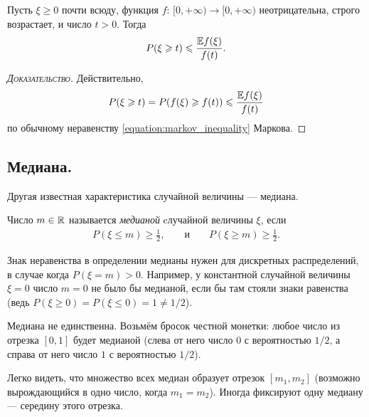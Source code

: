 \documentclass[../main.tex]{subfiles}
\begin{document}
\begin{prop}
 Пусть $ \xi \geqslant 0 $ почти всюду, функция $f \colon\, [0, +\infty) \to [0, +\infty)$ неотрицательна, строго возрастает, и число $ t > 0 $. Тогда
 \begin{align}
  \label{eq:general_markov_ineq}
  P(\xi \geqslant t) \leqslant \frac{\mathbb E f(\xi)}{f(t)}.
 \end{align}
\end{prop}
\begin{proof}[\normalfont\textsc{Доказательство}]
 Действительно,
 \begin{align*}
  P(\xi \geqslant t) = P(f(\xi) \geqslant f(t)) \leqslant \frac{\mathbb E f(\xi)}{f(t)}
 \end{align*} по обычному неравенству \eqref{equation:markov_inequality} Маркова.
\end{proof}

\subsection{Медиана.}

Другая известная характеристика случайной величины --- медиана.

\begin{df}
 Число $ m \in\mathbb{R}$ называется \textit{медианой} cлучайной величины $ \xi $, если
 \begin{align*}
  P(\xi \leqslant m) \geqslant \frac{1}{2}, & &\text{ и } & &P(\xi \geqslant m) \geqslant \frac{1}{2}.
 \end{align*} 
\end{df}
\begin{remrk*}
 Знак неравенства в определении медианы нужен для дискретных распределений, в случае когда $ P(\xi = m) > 0 $. Например, у константной случайной величины $ \xi = 0 $ число $ m = 0 $ не было бы медианой, если бы там стояли знаки равенства (ведь $ P(\xi \geqslant 0) = P(\xi \leqslant 0) = 1 \neq 1 / 2$).
\end{remrk*}
\begin{remrk*}
 Медиана не единственна. Возьмём бросок честной монетки: любое число из отрезка $ [0,1] $ будет медианой (слева от него число $ 0 $ с вероятностью $ 1 / 2 $, а справа от него число $ 1 $ с вероятностью $ 1 / 2 $). 
\end{remrk*}
\begin{remrk*}
 Легко видеть, что множество всех медиан образует отрезок $ [m_1,m_2] $ (возможно вырождающийся в одно число, когда $ m_1 = m_2 $). Иногда фиксируют одну медиану --- середину этого отрезка.
\end{remrk*}
\end{document}
